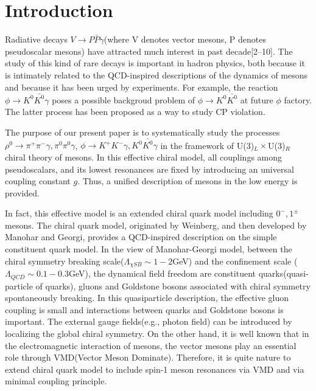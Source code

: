 \newpage
\section{Introduction}
Radiative decays $V \rightarrow P\bar P \gamma$(where V denotes vector
mesons, P denotes pseudoscalar mesons) have attracted much interest in
past decade[2--10]. The study of this kind of rare decays is important in
hadron physics, both because it is intimately related to the QCD-inspired
descriptions of the dynamics of mesons and because it has been urged
by experiments. For example, the reaction
$\phi\rightarrow K^0\bar{K^0}\gamma$ poses a possible backgroud problem of
$\phi\rightarrow K^0\bar{K^0}$ at future $\phi$ factory. The latter
process has been proposed as a way to study CP violation{\cite{b0}}.

The purpose of our present paper is to systematically study the processes
$\rho^0\rightarrow \pi^+\pi^-\gamma ,\pi^0\pi^0\gamma$,
$\phi \rightarrow K^+K^-\gamma ,K^0 \bar{K^0}\gamma$
in the framework of U(3)$_L\times$U(3)$_R$ chiral theory of 
mesons{\cite {Li1}}. In this effective chiral model, all couplings 
among pseudoscalars, and its lowest resonances are
fixed by introducing an universal coupling constant $g$. Thus, 
a unified description of mesons in the low energy is provided.


In fact, this effective model is an extended chiral quark model including 
$0^-, 1^\pm$ mesons. The chiral quark model,  originated by
Weinberg\cite{Wein79}, and then developed by Manohar and Georgi\cite{MG},
 provides a QCD-inspired description on the simple constituent quark
model. In the view of Manohar-Georgi model, between the chiral symmetry
breaking scale($\Lambda_{\chi SB}\sim 1-2$GeV) and the confinement scale
($\Lambda_{QCD} \sim 0.1-0.3$GeV), the dynamical field freedom are
constituent quarks(quasi-particle of quarks), gluons and Goldstone bosons
associated with chiral symmetry spontaneously breaking. In this
quasiparticle description, the effective gluon coupling is small and 
interactions between quarks and Goldstone bosons is important. 
The external gauge fields(e.g., photon field) can be introduced by
localizing the global chiral symmetry. On the other hand, it is well known
that in the electromagnetic interaction of mesons, the vector mesons play 
an essential role through VMD(Vector Meson Dominate)\cite{Sa}. Therefore, 
it is quite nature to extend chiral quark model to include spin-1 meson 
resonances via VMD and via minimal coupling principle.   
 
